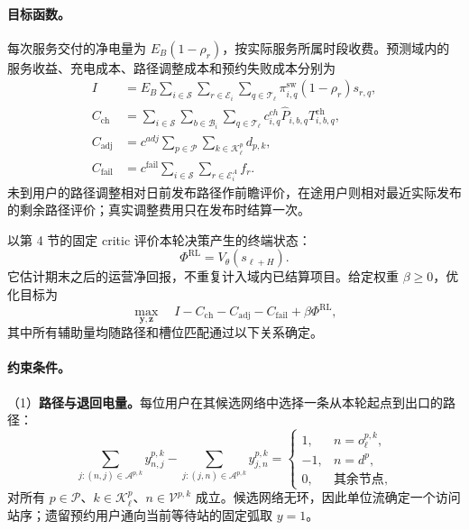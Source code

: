 \documentclass[12pt,a4paper,UTF8]{ctexart}
\begin{document}
\paragraph{目标函数。}
每次服务交付的净电量为 $E_B(1-\rho_r)$，按实际服务所属时段收费。预测域内的服务收益、充电成本、路径调整成本和预约失败成本分别为
\begin{align}
I&=E_B\sum_{i\in\mathcal S}\sum_{r\in\mathcal E_i}
\sum_{q\in\mathcal T_\ell}\pi_{i,q}^{\mathrm{sw}}(1-\rho_r)s_{r,q},
\label{eq:income}\\
C_{\mathrm{ch}}&=\sum_{i\in\mathcal S}\sum_{b\in\mathcal B_i}
\sum_{q\in\mathcal T_\ell}c^{ch}_{i,q}\widehat P_{i,b,q}T_{i,b,q}^{\mathrm{ch}},
\label{eq:chargingcost}\\
C_{\mathrm{adj}}&=c^{adj}\sum_{p\in\mathcal P}\sum_{k\in\mathcal K_\ell^p}d_{p,k},
\label{eq:adjustment_cost}\\
C_{\mathrm{fail}}&=c^{\mathrm{fail}}\sum_{i\in\mathcal S}\sum_{r\in\mathcal E_i^A}f_r.
\label{eq:reservation_failure_cost}
\end{align}
未到用户的路径调整相对日前发布路径作前瞻评价，在途用户则相对最近实际发布的剩余路径评价；真实调整费用只在发布时结算一次。

以第 4 节的固定 critic 评价本轮决策产生的终端状态：
\begin{equation}
\Phi^{\mathrm{RL}}=V_\theta(s_{\ell+H}).
\label{eq:rl_terminal_value}
\end{equation}
它估计期末之后的运营净回报，不重复计入域内已结算项目。给定权重 $\beta\ge0$，优化目标为
\begin{equation}
\max_{\mathbf y,\mathbf z}\quad
I-C_{\mathrm{ch}}-C_{\mathrm{adj}}-C_{\mathrm{fail}}+\beta\Phi^{\mathrm{RL}},
\label{eq:objective}
\end{equation}
其中所有辅助量均随路径和槽位匹配通过以下关系确定。

\paragraph{约束条件。}
（1）\textbf{路径与退回电量。}每位用户在其候选网络中选择一条从本轮起点到出口的路径：
\begin{equation}
\sum_{j:(n,j)\in\mathcal A^{p,k}}y_{n,j}^{p,k}
-\sum_{j:(j,n)\in\mathcal A^{p,k}}y_{j,n}^{p,k}
=\begin{cases}
1,&n=o_\ell^{p,k},\\
-1,&n=d^p,\\
0,&\text{其余节点},
\end{cases}
\label{eq:flow}
\end{equation}
对所有 $p\in\mathcal P$、$k\in\mathcal K_\ell^p$、$n\in\mathcal V^{p,k}$ 成立。候选网络无环，因此单位流确定一个访问站序；遗留预约用户通向当前等待站的固定弧取 $y=1$。
\end{document}
